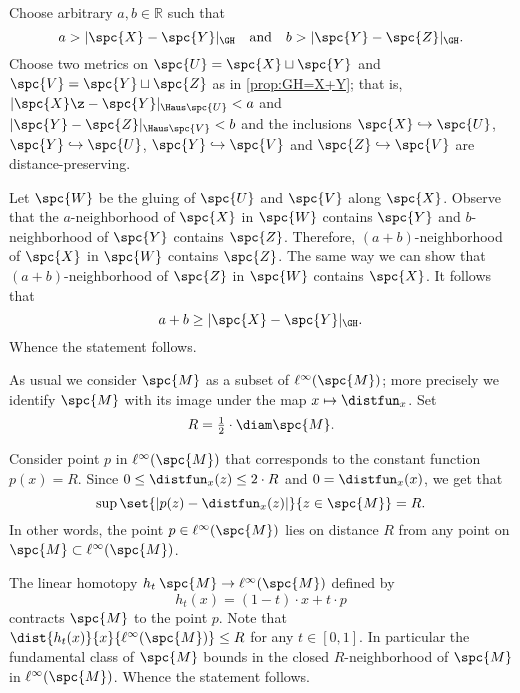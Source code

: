 Choose arbitrary $a,b \in \mathbb{R}$ such that
$$a>|\spc{X}-\spc{Y}|_{\GH}
\quad\text{and}\quad
b>|\spc{Y}-\spc{Z}|_{\GH}.$$
Choose two metrics on $\spc{U}=\spc{X}\sqcup \spc{Y}$ and $\spc{V}=\spc{Y}\sqcup \spc{Z}$ as in \ref{prop:GH=X+Y};
that is,
$|\spc{X}\z-\spc{Y}|_{\Haus\spc{U}}<a$ and $|\spc{Y}-\spc{Z}|_{\Haus\spc{V}}<b$ 
and the inclusions $\spc{X}\hookrightarrow \spc{U}$, $\spc{Y}\hookrightarrow \spc{U}$, $\spc{Y}\hookrightarrow \spc{V}$ and $\spc{Z}\hookrightarrow \spc{V}$ are distance-preserving.

Let $\spc{W}$ be the gluing of $\spc{U}$ and $\spc{V}$ along $\spc{X}$.
Observe that the $a$-neighborhood of $\spc{X}$ in $\spc{W}$ contains $\spc{Y}$ and $b$-neighborhood of $\spc{Y}$ contains $\spc{Z}$.
Therefore, $(a+b)$-neighborhood of $\spc{X}$ in $\spc{W}$ contains $\spc{Z}$.
The same way we can show that $(a+b)$-neighborhood of $\spc{Z}$ in $\spc{W}$ contains $\spc{X}$.
It follows that 
$$a+b\ge|\spc{X}-\spc{Y}|_{\GH}.$$
Whence the statement follows.
\qeds






















As usual we consider $\spc{M}$ as a subset of $\ell^\infty(\spc{M})$;
more precisely we identify $\spc{M}$ with its image under the map  $x\mapsto \distfun_x$.
Set 
\[R=\tfrac12\cdot\diam\spc{M}.\]

Consider point $p$ in $\ell^\infty(\spc{M})$ that corresponds to the constant function $p(x)=R$.
Since $0\le \distfun_x(z)\le  2\cdot R$ and $0=\distfun_x(x)$, we get that
\[\sup\set{|p(z)-\distfun_x(z)|}{z\in\spc{M}}=R.\]
In other words, the point $p\in \ell^\infty(\spc{M})$ lies on distance $R$ from any point on $\spc{M}\subset \ell^\infty(\spc{M})$.

The linear homotopy $h_t\:\spc{M}\to \ell^\infty(\spc{M})$ defined by
\[h_t(x)=(1-t)\cdot x+t\cdot p\]
contracts $\spc{M}$ to the point $p$.
Note that $\dist{h_t(x)}{x}{\ell^\infty(\spc{M})}\le R$ for any $t\in[0,1]$.
In particular the fundamental class of $\spc{M}$ bounds in the closed $R$-neighborhood of $\spc{M}$ in $\ell^\infty(\spc{M})$.
Whence the statement follows.

